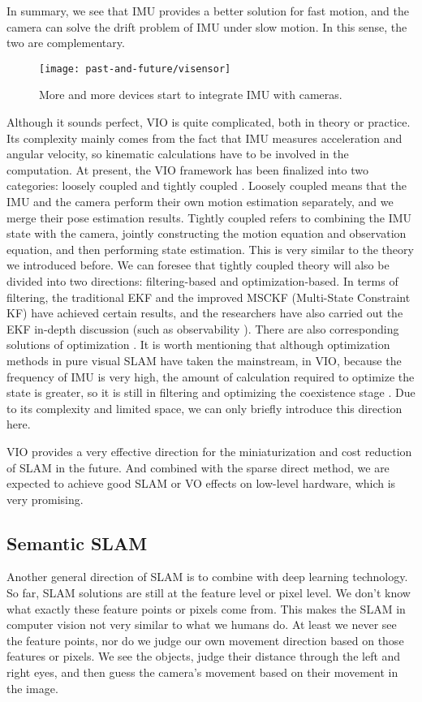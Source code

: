 In summary, we see that IMU provides a better solution for fast motion, and the camera can solve the drift problem of IMU under slow motion. In this sense, the two are complementary.

\begin{figure}[!thp]
	\centering
	\texttt{[image: past-and-future/visensor]}
	\caption{More and more devices start to integrate IMU with cameras. }
	\label{fig:visensor}
\end{figure}

Although it sounds perfect, VIO is quite complicated, both in theory or practice. Its complexity mainly comes from the fact that IMU measures acceleration and angular velocity, so kinematic calculations have to be involved in the computation. At present, the VIO framework has been finalized into two categories: loosely coupled and tightly coupled {\cite{Martinelli2014}}. Loosely coupled means that the IMU and the camera perform their own motion estimation separately, and we merge their pose estimation results. Tightly coupled refers to combining the IMU state with the camera, jointly constructing the motion equation and observation equation, and then performing state estimation. This is very similar to the theory we introduced before. We can foresee that tightly coupled theory will also be divided into two directions: filtering-based and optimization-based. In terms of filtering, the traditional EKF {\cite{Bloesch2015}} and the improved MSCKF (Multi-State Constraint KF) {\cite{Li2013}} have achieved certain results, and the researchers have also carried out the EKF in-depth discussion (such as observability {\cite{Huang2014}}). There are also corresponding solutions of optimization {\cite{Leutenegger2015, Forster2015}}. It is worth mentioning that although optimization methods in pure visual SLAM have taken the mainstream, in VIO, because the frequency of IMU is very high, the amount of calculation required to optimize the state is greater, so it is still in filtering and optimizing the coexistence stage {\cite{Tkocz2015, Usenko2016}}. Due to its complexity and limited space, we can only briefly introduce this direction here.

VIO provides a very effective direction for the miniaturization and cost reduction of SLAM in the future. And combined with the sparse direct method, we are expected to achieve good SLAM or VO effects on low-level hardware, which is very promising.

\subsection{Semantic SLAM}
Another general direction of SLAM is to combine with deep learning technology. So far, SLAM solutions are still at the feature level or pixel level. We don't know what exactly these feature points or pixels come from. This makes the SLAM in computer vision not very similar to what we humans do. At least we never see the feature points, nor do we judge our own movement direction based on those features or pixels. We see the objects, judge their distance through the left and right eyes, and then guess the camera's movement based on their movement in the image.

